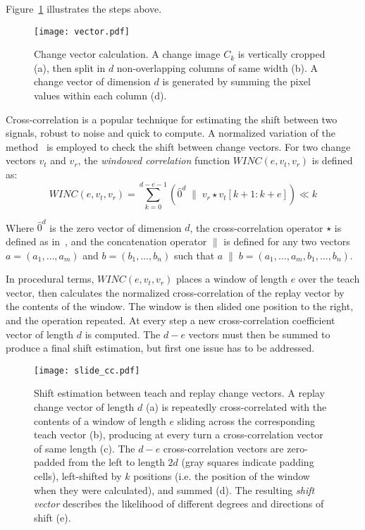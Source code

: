 \documentclass[twocolumn, 9pt,fleqn]{jsproceedings}
\begin{document}
Figure~\ref{fig:vector} illustrates the steps above.

\begin{figure}[h!]
\texttt{[image: vector.pdf]}
\caption{Change vector calculation. A change image $C_k$ is vertically cropped (a), then split in $d$ non-overlapping columns of same width (b). A change vector of dimension $d$ is generated by summing the pixel values within each column (d).}
\label{fig:vector}
\end{figure}

Cross-correlation is a popular technique for estimating the shift between two signals, robust to noise and quick to compute. A normalized variation of the method~\cite{HEL14b} is employed to check the shift between change vectors. For two change vectors $v_t$ and $v_r$, the \textit{windowed correlation} function $WINC(e, v_t, v_r)$ is defined as:
\begin{equation}
WINC(e, v_t, v_r) = \sum_{k=0}^{d-e-1}{(\hat{0}^d \; \| \; v_r \star v_t[k+1:k+e]) \ll k}
\end{equation}

Where $\hat{0}^d$ is the zero vector of dimension $d$, the cross-correlation operator $\star$ is defined as in~\cite{HEL14b}, and the concatenation operator $\|$ is defined for any two vectors $a = (a_1, \dotsc, a_m)$ and $b = (b_1, \dotsc, b_n)$ such that $a \; \| \; b = (a_1, \dotsc, a_m, b_1, \dotsc, b_n)$.

In procedural terms, $WINC(e, v_t, v_r)$ places a window of length $e$ over the teach vector, then calculates the normalized cross-correlation of the replay vector by the contents of the window. The window is then slided one position to the right, and the operation repeated. At every step a new cross-correlation coefficient vector of length $d$ is computed. The $d - e$ vectors must then be summed to produce a final shift estimation, but first one issue has to be addressed.

\begin{figure}[h!]
\texttt{[image: slide\_cc.pdf]}
\caption{Shift estimation between teach and replay change vectors. A replay change vector of length $d$ (a) is repeatedly cross-correlated with the contents of a window of length $e$ sliding across the corresponding teach vector (b), producing at every turn a cross-correlation vector of same length (c). The $d - e$ cross-correlation vectors are zero-padded from the left to length $2d$ (gray squares indicate padding cells), left-shifted by $k$ positions (i.e. the position of the window when they were calculated), and summed (d). The resulting \textit{shift vector} describes the likelihood of different degrees and directions of shift (e).}
\label{fig:slide_cc}
\end{figure}
\end{document}

